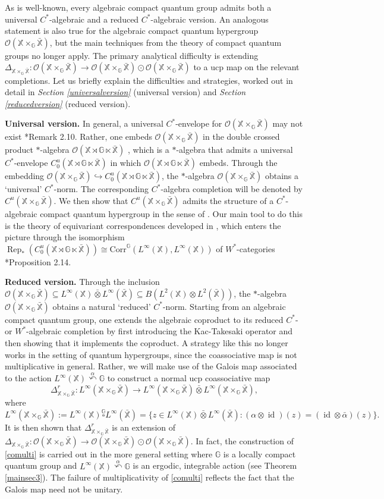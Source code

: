 \documentclass[reqno]{amsart}
\numberwithin{equation}{section}
\newcommand\XGX{\X\times_\G \bar{\X}}
\newcommand\XrX{\X\rtimes\G \ltimes\bar{\X}}
\DeclareMathOperator{\id}{\mathrm{id}}
\DeclareMathOperator{\Rep}{\mathrm{Rep}}
\newcommand{\mcO}{\mathcal{O}}
\newcommand{\G}{\mathbb{G}}
\newcommand{\X}{\mathbb{X}}
\newcommand{\Corr}{\mathrm{Corr}}
\newcommand{\ovot}{\bar{\otimes}}
\begin{document}
As is well-known, every algebraic compact quantum group admits both a universal $C^*$-algebraic and a reduced $C^*$-algebraic version. An analogous statement is also true for the algebraic compact quantum hypergroup $\mcO(\XGX)$, but the main techniques from the theory of compact quantum groups no longer apply. The primary analytical difficulty is extending $\Delta_{\XGX}: \mcO(\XGX)\to \mcO(\XGX)\odot \mcO(\XGX)$ to a ucp map on the relevant completions. Let us briefly explain the difficulties and strategies, worked out in detail in \emph{Section \ref{universalversion}} (universal version) and \emph{Section \ref{reducedversion}} (reduced version). 

\textbf{Universal version.} In general, a universal $C^*$-envelope for $\mcO(\XGX)$ may not exist \cite{DCDR25}*{Remark 2.10}. Rather, one embeds $\mcO(\XGX)$ in the double crossed product $*$-algebra $\mcO(\XrX)$ \cites{AS21,DCDR25}, which is a $*$-algebra that admits a universal $C^*$-envelope $C^u_0(\XrX)$ in which $\mcO(\XrX)$ embeds. Through the embedding $\mcO(\XGX)\hookrightarrow C_0^u(\XrX)$, the $*$-algebra $\mcO(\XGX)$ obtains a `universal' $C^*$-norm. The corresponding $C^*$-algebra completion will be denoted by $C^u(\XGX)$. We then show that $C^u(\XGX)$ admits the structure of a $C^*$-algebraic compact quantum hypergroup in the sense of \cite{CV99}. Our main tool to do this is the theory of equivariant correspondences developed in \cites{DCDR24, DCDR25}, which enters the picture through the isomorphism
$\Rep_*(C^u_0(\XrX))\cong \Corr^\G(L^\infty(\X), L^\infty(\X))$
of $W^*$-categories \cite{DCDR25}*{Proposition 2.14}. 

\textbf{Reduced version.} Through the inclusion $\mcO(\XGX)\subseteq L^\infty(\X)\ovot L^\infty(\bar{\X})\subseteq B(L^2(\X)\otimes L^2(\bar{\X}))$, the $*$-algebra $\mcO(\XGX)$ obtains a natural `reduced' $C^*$-norm.
Starting from an algebraic compact quantum group, one extends the algebraic coproduct to its reduced $C^*$-or $W^*$-algebraic completion by first introducing the Kac-Takesaki operator and then showing that it implements the coproduct. A strategy like this no longer works in the setting of quantum hypergroups, since the coassociative map is not multiplicative in general. Rather, we will make use of the Galois map associated to the action $L^\infty(\X)\stackrel{\alpha}\curvearrowleft \G$ \cites{DC09a,DC11} to construct a normal ucp coassociative map
\begin{equation}\label{comulti}\Delta_{\XGX}^r: L^\infty(\XGX)\to L^\infty(\XGX)\ovot L^\infty(\XGX),\end{equation}
where $L^\infty(\XGX):= L^\infty(\X)\stackrel{\G}\square L^\infty(\bar{\X})= \{z \in L^\infty(\X)\ovot L^\infty(\bar{\X}): (\alpha\otimes \id)(z)= (\id \otimes \bar{\alpha})(z)\}.$
It is then shown that $\Delta_{\XGX}^r$ is an extension of $\Delta_{\XGX}: \mcO(\XGX)\to \mcO(\XGX)\odot \mcO(\XGX)$.
In fact, the construction of \eqref{comulti} is carried out in the more general setting where $\G$ is a locally compact quantum group and $L^\infty(\X)\stackrel{\alpha}\curvearrowleft \G$ is an ergodic, integrable action (see Theorem \ref{mainsec3}). The failure of multiplicativity of \eqref{comulti} reflects the fact that the Galois map need not be unitary.
\end{document}
